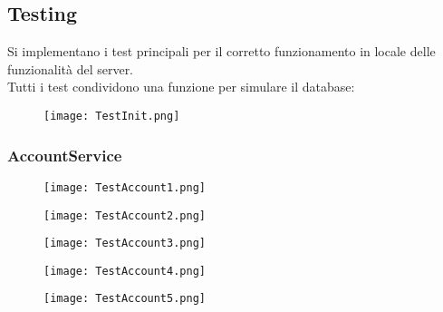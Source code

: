 \subsection{Testing}
Si implementano i test principali per il corretto funzionamento in locale delle funzionalità del server.\\
Tutti i test condividono una funzione per simulare il database:
\begin{figure}[h!]
    \begin{center}
        \texttt{[image: TestInit.png]}
    \end{center}
\end{figure}
\subsubsection{AccountService}
\begin{figure}[h!]
    \begin{center}
        \texttt{[image: TestAccount1.png]}
    \end{center}
\end{figure}
\begin{figure}[h!]
    \begin{center}
        \texttt{[image: TestAccount2.png]}
    \end{center}
\end{figure}
\begin{figure}[h!]
    \begin{center}
        \texttt{[image: TestAccount3.png]}
    \end{center}
\end{figure}
\begin{figure}[h!]
    \begin{center}
        \texttt{[image: TestAccount4.png]}
    \end{center}
\end{figure}
\begin{figure}[h!]
    \begin{center}
        \texttt{[image: TestAccount5.png]}
    \end{center}
\end{figure}
\clearpage


